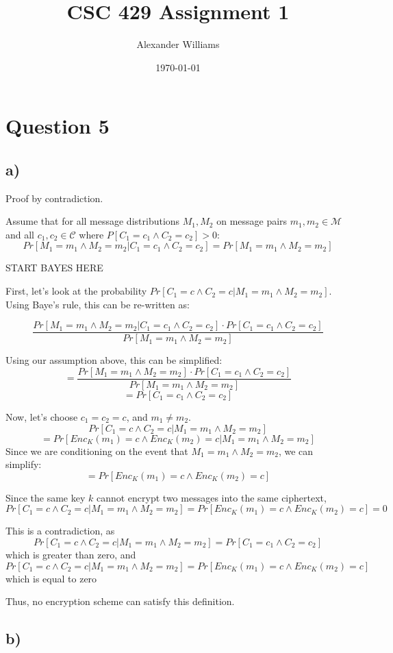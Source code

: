 \documentclass{article}
\title{CSC 429 Assignment 1}
\author{Alexander Williams}
\date{\today}
\begin{document}
\maketitle
\section*{Question 5}
\subsection*{a)}

Proof by contradiction.

Assume that for all message distributions $M_1, M_2$ on message pairs 
$m_1,m_2\in\mathcal{M}$ and all $c_1,c_2\in\mathcal{C}$ where 
$P[C_1=c_1\wedge{}C_2=c_2]>0$:
$$
Pr[M_1=m_1\wedge{}M_2=m_2|C_1=c_1\wedge{}C_2=c_2]=Pr[M_1=m_1\wedge{}M_2=m_2]
$$

START BAYES HERE

First, let's look at the probability
$Pr[C_1=c\wedge{}C_2=c|M_1=m_1\wedge{}M_2=m_2]$. Using Baye's rule, this can be re-written as:

$$
\frac
{
    Pr[M_1=m_1\wedge{}M_2=m_2|C_1=c_1\wedge{}C_2=c_2]\cdot{}Pr[C_1=c_1\wedge{}C_2=c_2]
}{
    Pr[M_1=m_1\wedge{}M_2=m_2]
}
$$

Using our assumption above, this can be simplified:
$$
=\frac{
    Pr[M_1=m_1\wedge{}M_2=m_2]\cdot{}Pr[C_1=c_1\wedge{}C_2=c_2]
}{
    Pr[M_1=m_1\wedge{}M_2=m_2]
}
$$
$$
=Pr[C_1=c_1\wedge{}C_2=c_2]
$$

Now, let's choose $c_1=c_2=c$, and $m_1\neq{}m_2$.
$$
Pr[C_1=c\wedge{}C_2=c|M_1=m_1\wedge{}M_2=m_2]
$$
$$
=Pr[Enc_K(m_1)=c\wedge{}Enc_K(m_2)=c|M_1=m_1\wedge{}M_2=m_2]
$$
Since we are conditioning on the event that $M_1=m_1\wedge{}M_2=m_2$, we can simplify:
$$
=Pr[Enc_K(m_1)=c \wedge{} Enc_K(m_2)=c]
$$

Since the same key $k$ cannot encrypt two messages into the same ciphertext, 
$$
Pr[C_1=c\wedge{}C_2=c|M_1=m_1\wedge{}M_2=m_2]=Pr[Enc_K(m_1)=c\wedge{}Enc_K(m_2)=c]=0
$$

This is a contradiction, as 
$$Pr[C_1=c\wedge{}C_2=c|M_1=m_1\wedge{}M_2=m_2]=Pr[C_1=c_1\wedge{}C_2=c_2]$$
which is greater than zero, and 
$$Pr[C_1=c\wedge{}C_2=c|M_1=m_1\wedge{}M_2=m_2]=Pr[Enc_K(m_1)=c\wedge{}Enc_K(m_2)=c]$$
which is equal to zero

Thus, no encryption scheme can satisfy this definition.

\subsection*{b)}
\end{document}
